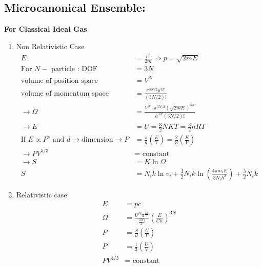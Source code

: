 \subsection{Microcanonical Ensemble:}
\textbf{For Classical Ideal Gas }\\
\begin{enumerate}[label=\alph*)]
	\item  Non Relativistic Case
	\begin{align*}
	E&=\frac{p^{2}}{2 m} \Rightarrow p=\sqrt{2 m E}\\
	\text{For }N-\text{ particle : DOF }&=3 N\\
	\text{volume of position space }&=V^{N}\\
	\text{volume of momentum space }&=\frac{\pi^{3 N / 2} p^{3 N}}{(3 N / 2) !}\\
	\rightarrow \Omega&=\frac{V^{N} \cdot \pi^{3 N / 2}(\sqrt{2 m E})^{3 N}}{h^{3 N}(3 N / 2) !}\\
	\rightarrow E&=U=\frac{3}{2} N K T=\frac{3}{2} n R T \\
	\text{If }E\propto P^s \text{ and }d \rightarrow\text{dimension}
	\rightarrow P&=\frac{s}{d}\left(\frac{E}{V}\right)=\frac{2}{3}\left(\frac{E}{V}\right) \\
	\rightarrow P V^{5 / 3}&=\text { constant } \\
	\rightarrow S&=K \ln \Omega\\
	S&=N_{i} k \ln v_{i}+\frac{3}{2} N_{i} k \ln \left(\frac{4 \pi m_{i} E}{3 N_{i} h^{2}}\right)+\frac{3}{2} N_{i} k
	\end{align*}
	\item  Relativistic case
	\begin{align*}
	E&=pc\\
	\Omega&=\frac{U^N\pi^\frac{3N}{2}}{\frac{3N}{2}!}\left(\frac{E}{C h}\right)^{3 N}\\
	P&=\frac{S}{d}\left(\frac{U}{V} \right) \\
	P&=\frac{1}{3}\left(\frac{U}{V}\right)\\
	P V^{4 / 3}&=\text { constant }
	\end{align*}
\end{enumerate}
